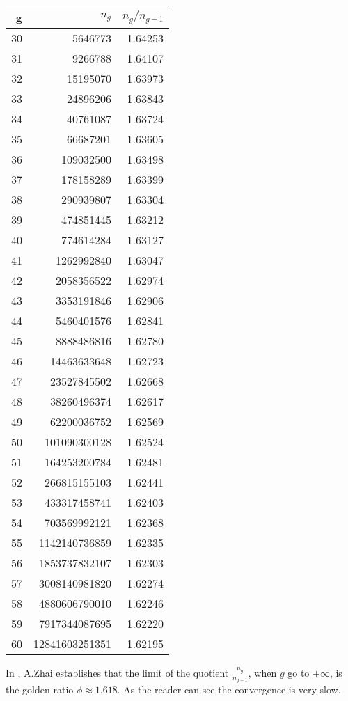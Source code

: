 \documentclass[reqno,11pt]{amsart}
\theoremstyle{plain}
\theoremstyle{definition}
\begin{document}
\begin{minipage}{0.5\textwidth}
\begin{tabular}{|r|r|r|}
\hline
g & $n_g$ & $n_g/n_{g-1}$\\
\hline
30 & 5646773 & 1.64253 \\
31 & 9266788 & 1.64107 \\
32 & 15195070 & 1.63973 \\
33 & 24896206 & 1.63843 \\
34 & 40761087 & 1.63724 \\
35 & 66687201 & 1.63605 \\
36 & 109032500 & 1.63498 \\
37 & 178158289 & 1.63399 \\
38 & 290939807 & 1.63304 \\
39 & 474851445 & 1.63212 \\
40 & 774614284 & 1.63127 \\
41 & 1262992840 & 1.63047 \\
42 & 2058356522 & 1.62974 \\
43 & 3353191846 & 1.62906 \\
44 & 5460401576 & 1.62841 \\
45 & 8888486816 & 1.62780 \\
46 & 14463633648 & 1.62723 \\
47 & 23527845502 & 1.62668 \\
48 & 38260496374 & 1.62617 \\
49 & 62200036752 & 1.62569 \\
50 & 101090300128 & 1.62524 \\
51 & 164253200784 & 1.62481 \\
52 & 266815155103 & 1.62441 \\
53 & 433317458741 & 1.62403 \\
54 & 703569992121 & 1.62368 \\
55 & 1142140736859 & 1.62335 \\
56 & 1853737832107 & 1.62303 \\
57 & 3008140981820 & 1.62274 \\
58 & 4880606790010 & 1.62246 \\
59 & 7917344087695 & 1.62220 \\
60 & 12841603251351 & 1.62195 \\
\hline
\end{tabular}
\end{minipage}
\vspace{2em}

In \cite{Zhai}, A.Zhai establishes that the limit of the quotient   $\frac{n_g}{n_{g-1}}$, when $g$ go to $+\infty$, is the golden ratio $\phi\approx 1.618$. 
As the reader can see the convergence is very slow.
\end{document}
